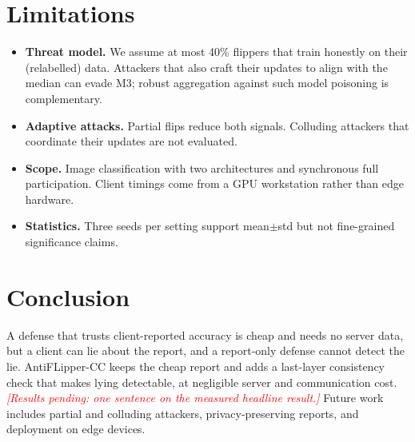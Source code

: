 \documentclass[conference]{IEEEtran}
\newcommand{\pending}[1]{\textcolor{red}{\textit{[Results pending: #1]}}}
\begin{document}
\section{Limitations}
\label{sec:limits}
\begin{itemize}
\item \textbf{Threat model.} We assume at most 40\% flippers that train honestly on their (relabelled) data. Attackers that also craft their updates to align with the median can evade M3; robust aggregation against such model poisoning is complementary.
\item \textbf{Adaptive attacks.} Partial flips reduce both signals. Colluding attackers that coordinate their updates are not evaluated.
\item \textbf{Scope.} Image classification with two architectures and synchronous full participation. Client timings come from a GPU workstation rather than edge hardware.
\item \textbf{Statistics.} Three seeds per setting support mean$\pm$std but not fine-grained significance claims.
\end{itemize}

\section{Conclusion}
\label{sec:conclusion}
A defense that trusts client-reported accuracy is cheap and needs no server data, but a client can lie about the report, and a report-only defense cannot detect the lie. AntiFLipper-CC keeps the cheap report and adds a last-layer consistency check that makes lying detectable, at negligible server and communication cost.
\pending{one sentence on the measured headline result.} Future work includes partial and colluding attackers, privacy-preserving reports, and deployment on edge devices.



\end{document}
